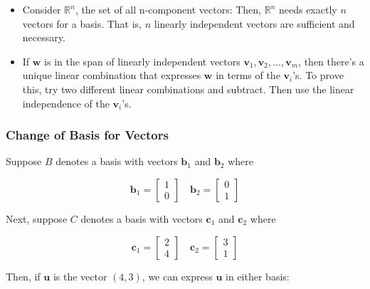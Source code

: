 \documentclass[main.tex]{subfiles}
\begin{document}
\begin{itemize}
        \item Consider $\mathbb{R}^{n}$, the set of all $\mathrm{n}$-component vectors: Then, $\mathbb{R}^{n}$ needs exactly $n$ vectors for a basis. That is, $n$ linearly independent vectors are sufficient and necessary.
        
        \item If $\mathbf{w}$ is in the span of linearly independent vectors $\mathbf{v}_{1}, \mathbf{v}_{2}, \ldots, \mathbf{v}_{m}$, then there's a unique linear combination that expresses $\mathbf{w}$ in terms of the $\mathbf{v}_{i}$'s. To prove this, try two different linear combinations and subtract. Then use the linear independence of the $\mathbf{v}_{i}$'s.
    
    \end{itemize}
    
    \subsubsection{Change of Basis for Vectors}
    
    Suppose $B$ denotes a basis with vectors $\mathbf{b}_{1}$ and $\mathbf{b}_{2}$ where
    
    $$
    \mathbf{b}_{1}=\left[\begin{array}{l}
    1 \\
    0
    \end{array}\right] \quad \mathbf{b}_{2}=\left[\begin{array}{l}
    0 \\
    1
    \end{array}\right]
    $$
    
    Next, suppose $C$ denotes a basis with vectors $\mathbf{c}_{1}$ and $\mathbf{c}_{2}$ where 
    
    $$
    \mathbf{c}_{1}=\left[\begin{array}{l}
    2 \\
    4
    \end{array}\right] \quad \mathbf{c}_{2}=\left[\begin{array}{l}
    3 \\
    1
    \end{array}\right]
    $$
    
    Then, if $\mathbf{u}$ is the vector $(4,3)$, we can express $\mathbf{u}$ in either basis:
    
\end{document}
